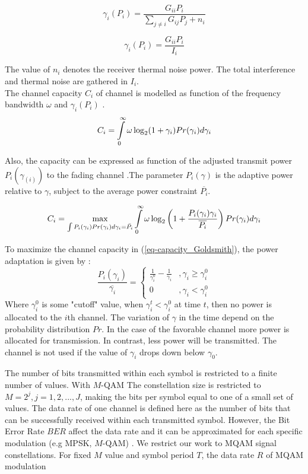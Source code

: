 \documentclass[conference]{IEEEtran}
\begin{document}
\begin{equation}
\label{eq-sinr}
\gamma_{i}(P_{i})=\frac{G_{ii}P_{i}}{\underset{j\neq i}{\sum}G_{ij}P_{j}+n_{i}}
\end{equation}

\[
\gamma_{i}(P_{i})=\frac{G_{ii}P_{i}}{I_{i}}
\]

The value of $n_{i}$ denotes the receiver thermal noise power. The total interference and thermal noise are gathered in $I_{i}$.\\

The channel capacity  $C_{i}$ of channel is modelled as function of the frequency bandwidth $\omega$ and  $\gamma_{i}(P_{i})$   \cite{Shannon1948}. 
\begin{equation}
\label{eq-capacity_shannon}
C_{i}=\intop_{0}^{\infty}
 \omega\log_{2}(1+\gamma_{i})Pr(\gamma_{i})d
 \gamma_{i}
 \end{equation}

Also, the capacity can be expressed as function of the adjusted transmit power $P_{i}(\gamma_(i))$ to the fading channel \cite{Goldsmith1997}.The parameter $P_{i}(\gamma)$ is the adaptive power relative to $\gamma$, subject to the average power constraint $\overline{P_{i}}$.

\begin{equation}
\label{eq-capacity_Goldsmith}
C_{i}=\underset{\int P_{i}(\gamma_{i})Pr(\gamma_{i})d\gamma_{i}=\bar{P_{i}}}{\max}\intop_{0}^{\infty}\omega\log_{2}\left(1+\frac{P_{i}(\gamma_{i})\gamma_{i}}{\overline{P_{i}}}\right)Pr(\gamma_{i})d\gamma_{i}
 \end{equation}
 
To maximize the channel capacity in (\ref{eq-capacity_Goldsmith}), the power adaptation is given by : 
\[
\frac{P_{i}(\gamma_{i})}{\overline{\gamma_{i}}}=\begin{cases}
\frac{1}{\gamma_{i}^{0}}-\frac{1}{\gamma_{i}} & ,\gamma_{i}\geqslant\gamma_{i}^{0}\\
0 & ,\gamma_{i}<\gamma_{i}^{0}
\end{cases}
\]
Where $\gamma_{i}^{0}$ is some "cutoff" value, when  $\gamma_{i}^{t}
 <\gamma_{i}^{0}$ at time $t$, then no power is allocated to the $i$th channel. The variation of $\gamma$ in the time depend on the probability distribution $Pr$. In the case of the favorable channel more power is allocated for transmission. In contrast, less power will be transmitted. The channel is not used if the value of $\gamma_{i}$ drops down below $\gamma_{0}$.
 
The number of bits transmitted within each symbol is restricted to a finite number of values. With $M$-QAM The constellation size is restricted to $M=2^{j}, j=1,2,...,J$, making the bits per symbol equal to one of a small set of values. The data rate of one channel is defined here as the number of bits that can be successfully received within each transmitted symbol. However, the Bit Error Rate $BER$ affect the data rate and it can be approximated for each specific modulation (e.g MPSK, $M$-QAM) \cite{Cheng2008}. We restrict our work to MQAM signal constellations. For fixed $M$ value and symbol period $T$, the data rate $R$ of MQAM modulation 
\end{document}
